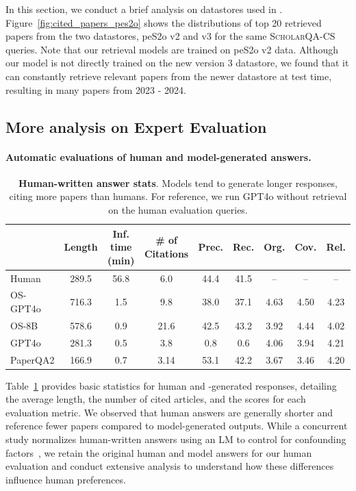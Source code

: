 In this section, we conduct a brief analysis on datastores used in \model. 
Figure~\ref{fig:cited_papers_pes2o} shows the distributions of top 20 retrieved papers from the two datastores, peS2o v2 and v3 for the same \textsc{ScholarQA-CS} queries. Note that our retrieval models are trained on peS2o v2 data. Although our model is not directly trained on the new version 3 datastore, we found that it can constantly retrieve relevant papers from the newer datastore at test time, resulting in many papers from 2023 - 2024. 



\subsection{More analysis on Expert Evaluation}
\label{app_sec:human_evaluation}

\paragraph{Automatic evaluations of human and model-generated answers.} 
\begin{table}[h]
\small
    \centering
    \begin{tabular}{l |cccccccc}
    \toprule
        &  Length & Inf. time (min) &   \# of Citations & Prec. & Rec. & Org. & Cov. & Rel.   \\
    \midrule
 Human & 289.5 & 56.8 & 6.0 & 44.4  & 41.5  & -- & -- & --   \\ \hdashline
\textsc{OS}-GPT4o & 716.3 & 1.5 & 9.8 & 38.0 & 37.1&  4.63 & 4.50 & 4.23  \\ 
\textsc{OS}-8B & 578.6 &  0.9 & 21.6 & 42.5 & 43.2  &   3.92 & 4.44 & 4.02  \\\hdashline
    GPT4o & 281.3 & 0.5& 3.8 &  0.8 & 0.6 &  4.06 & 3.94 & 4.21 \\
    PaperQA2 & 166.9 & 0.7 & 3.14  & 53.1 & 42.2 & 3.67 &  3.46 & 4.20 \\ 
    \bottomrule
    \end{tabular}
        \caption{{\bf Human-written answer stats}. Models tend to generate longer responses, citing more papers than humans. For reference, we run GPT4o without retrieval on the human evaluation queries. 
    }
    \label{table:result_human_data}
\end{table}
Table~\ref{table:result_human_data} provides basic statistics for human and \model-generated responses, detailing the average length, the number of cited articles, and the scores for each evaluation metric. We observed that human answers are generally shorter and reference fewer papers compared to model-generated outputs. 
While a concurrent study normalizes human-written answers using an LM to control for confounding factors~\citep{si2024can}, we retain the original human and model answers for our human evaluation and conduct extensive analysis to understand how these differences influence human preferences. 

